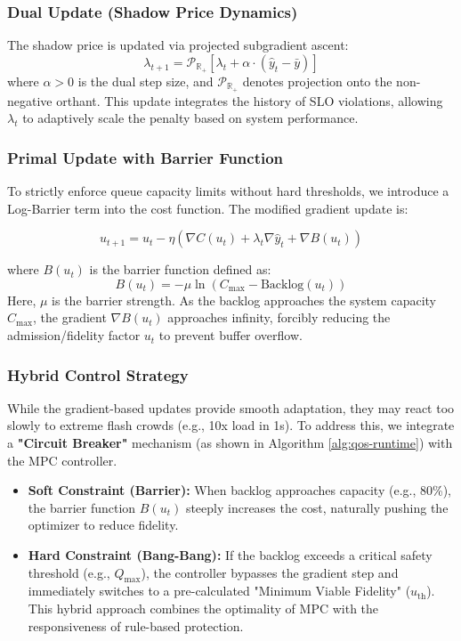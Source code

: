 \documentclass[journal]{IEEEtran}
\begin{document}
\subsubsection{Dual Update (Shadow Price Dynamics)} 
The shadow price is updated via projected subgradient ascent: 
\begin{equation} 
\label{eq:dual_update} 
\lambda_{t+1} = \mathcal{P}_{\mathbb{R}_+} \left[ \lambda_t + \alpha \cdot \left( \hat{y}_t - \bar{y} \right) \right] 
\end{equation} 
where $\alpha > 0$ is the dual step size, and $\mathcal{P}_{\mathbb{R}_+}$ denotes projection onto the non-negative orthant. This update integrates the history of SLO violations, allowing $\lambda_t$ to adaptively scale the penalty based on system performance. 

\subsubsection{Primal Update with Barrier Function}
To strictly enforce queue capacity limits without hard thresholds, we introduce a Log-Barrier term into the cost function. The modified gradient update is:

\begin{equation}
u_{t+1} = u_t - \eta \left( \nabla C(u_t) + \lambda_t \nabla \hat{y}_t + \nabla B(u_t) \right)
\end{equation}

where $B(u_t)$ is the barrier function defined as:
\begin{equation}
B(u_t) = -\mu \ln(C_{\max} - \text{Backlog}(u_t))
\end{equation}
Here, $\mu$ is the barrier strength. As the backlog approaches the system capacity $C_{\max}$, the gradient $\nabla B(u_t)$ approaches infinity, forcibly reducing the admission/fidelity factor $u_t$ to prevent buffer overflow.

\subsubsection{Hybrid Control Strategy}
While the gradient-based updates provide smooth adaptation, they may react too slowly to extreme flash crowds (e.g., 10x load in 1s). To address this, we integrate a \textbf{"Circuit Breaker"} mechanism (as shown in Algorithm \ref{alg:qos-runtime}) with the MPC controller.
\begin{itemize}
    \item \textbf{Soft Constraint (Barrier):} When backlog approaches capacity (e.g., 80\%), the barrier function $B(u_t)$ steeply increases the cost, naturally pushing the optimizer to reduce fidelity.
    \item \textbf{Hard Constraint (Bang-Bang):} If the backlog exceeds a critical safety threshold (e.g., $Q_{\max}$), the controller bypasses the gradient step and immediately switches to a pre-calculated "Minimum Viable Fidelity" ($u_{\text{th}}$). This hybrid approach combines the optimality of MPC with the responsiveness of rule-based protection.
\end{itemize}
\end{document}
